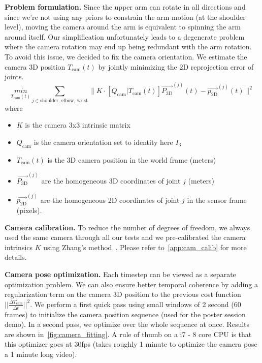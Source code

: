 \noindent\textbf{Problem formulation.} Since the upper arm can rotate in all directions and since we're not using any priors to constrain 
the arm motion (at the shoulder level), moving the camera around the arm is equivalent to spinning the arm around itself. 
Our simplification unfortunately leads to a degenerate problem where the camera rotation may end up being redundant with the arm rotation.
To avoid this issue, we decided to fix the camera orientation. 
We estimate the camera 3D position $T_{\text{cam}}(t)$ 
by jointly minimizing the 2D reprojection error of joints.
$$\underset{T_{\text{cam}}(t)}{min}\sum_{j\in{\text{shoulder, elbow, wrist}}}\|K\cdot\left[Q_{\text{cam}} | T_{\text{cam}}(t)\right] \vec{P_{\textrm{3D}}}^{(j)}(t) - \vec{p_{\textrm{2D}}}^{(j)}(t) \|^2$$
where
\begin{itemize}
    \item $K$ is the camera 3x3 intrinsic matrix
    \item $Q_{\textrm{cam}}$ is the camera orientation set to identity here $I_{3}$
    \item $T_{\textrm{cam}}(t)$ is the 3D camera position in the world frame (meters)
    \item $\vec{P_{\textrm{3D}}}^{(j)}$ are the homogeneous 3D coordinates of joint $j$ (meters)
    \item $\vec{p_{\textrm{2D}}}^{(j)}$ are the homogeneous 2D coordinates of joint $j$ in the sensor frame (pixels).
\end{itemize}

\noindent\textbf{Camera calibration.} To reduce the number of degrees of freedom, we always used the same camera through all our tests and 
we pre-calibrated the camera intrinsics $K$ using Zhang's method~\cite{Zhang00calib}.
Please refer to~\cref{app:cam_calib} for more details.

\noindent\textbf{Camera pose optimization.}
Each timestep can be viewed as a separate optimization problem. We can also ensure better temporal coherence
by adding a regularization term on the camera 3D position to the previous cost function $||\frac{\Delta T_{\text{cam}}}{\Delta{t}}||^2$.
We perform a first quick pass using small windows of 2 second (60 frames) to initialize the camera position sequence (used for the poster session demo).
In a second pass, we optimize over the whole sequence at once.
Results are shown in~\cref{fig:camera_fitting}.
A rule of thumb on a i7 - 8 core CPU is that this optimizer goes at 30fps (takes roughly 1 minute to optimize the camera pose a 1 minute long video).


